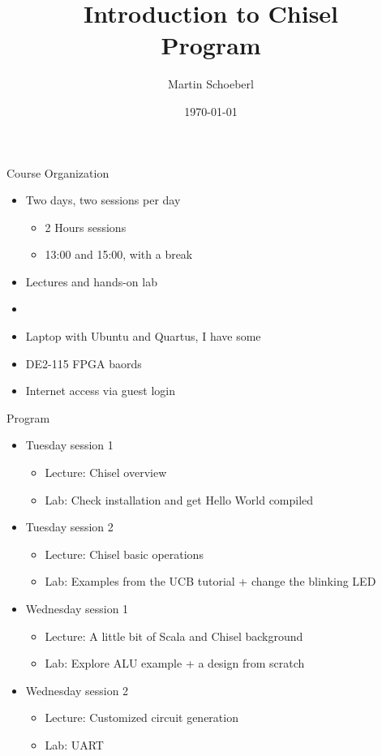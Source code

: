 \documentclass[xcolor=pdflatex,dvipsnames,table]{beamer}
\title{Introduction to Chisel\\Program}
\author{Martin Schoeberl}
\date{\today}
\institute{Technical University of Denmark}
\begin{document}
\begin{frame}
\titlepage
\end{frame}


\begin{frame}[fragile]{Course Organization}
\begin{itemize}
\item Two days, two sessions per day
\begin{itemize}
\item 2 Hours sessions
\item 13:00 and 15:00, with a break
\end{itemize}
\item Lectures and hands-on lab
\item 
\item Laptop with Ubuntu and Quartus, I have some
\item DE2-115 FPGA baords
\item Internet access via guest login
\end{itemize}
\end{frame}

\begin{frame}[fragile]{Program}
\begin{itemize}
\item Tuesday session 1
\begin{itemize}
\item Lecture: Chisel overview
\item Lab: Check installation and get Hello World compiled
\end{itemize}
\item Tuesday session 2
\begin{itemize}
\item Lecture: Chisel basic operations
\item Lab: Examples from the UCB tutorial + change the blinking LED
\end{itemize}
\item Wednesday session 1
\begin{itemize}
\item Lecture: A little bit of Scala and Chisel background 
\item Lab: Explore ALU example + a design from scratch
\end{itemize}
\item Wednesday session 2
\begin{itemize}
\item Lecture: Customized circuit generation
\item Lab: UART
\end{itemize}
\end{itemize}
\end{frame}
\end{document}
